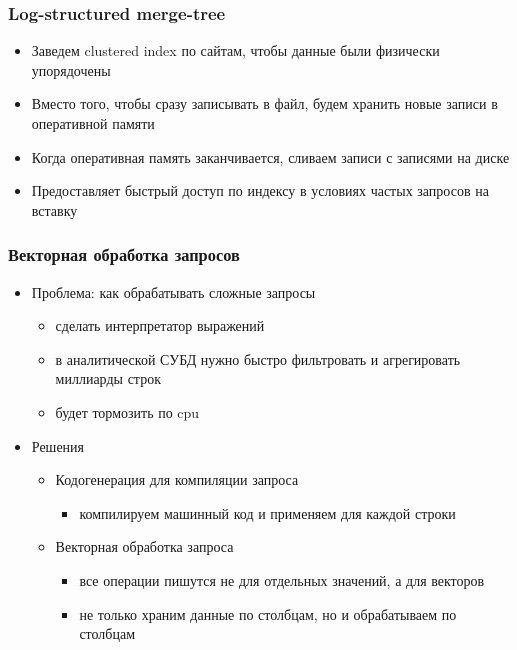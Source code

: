 \documentclass[xetex,mathserif,serif]{beamer}
\begin{document}
\begin{frame}
	\frametitle{Log-structured merge-tree}

	\begin{itemize}
		\item Заведем clustered index по сайтам, чтобы данные были физически упорядочены
		\item Вместо того, чтобы сразу записывать в файл, будем хранить новые записи в оперативной памяти
		\item Когда оперативная память заканчивается, сливаем записи с записями на диске
		\item Предоставляет быстрый доступ по индексу в условиях частых запросов на вставку
	\end{itemize}
\end{frame}


\begin{frame}
	\frametitle{Векторная обработка запросов}

	\begin{itemize}
		\item Проблема: как обрабатывать сложные запросы
		      \begin{itemize}
			      \item сделать интерпретатор выражений
			      \item в аналитической СУБД нужно быстро фильтровать и агрегировать миллиарды строк
			      \item будет тормозить по cpu
		      \end{itemize}
		\item Решения
		      \begin{itemize}
			      \item Кодогенерация для компиляции запроса
			            \begin{itemize}
				            \item компилируем машинный код и применяем для каждой строки
			            \end{itemize}
			      \item Векторная обработка запроса
			            \begin{itemize}
				            \item все операции пишутся не для отдельных значений, а для векторов
				            \item не только храним данные по столбцам, но и обрабатываем по столбцам
			            \end{itemize}
		      \end{itemize}
	\end{itemize}
\end{frame}
\end{document}
